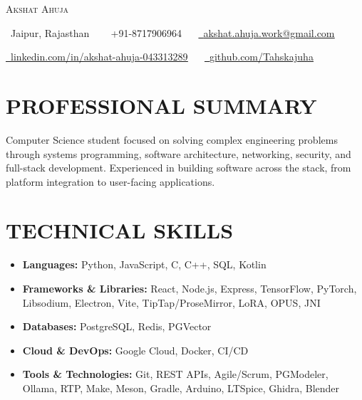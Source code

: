 \documentclass[letterpaper,11pt]{article}
\begin{document}
\begin{center}
    {\Huge \scshape \color{ACCENT_COLOR} Akshat Ahuja} \\ \vspace{1pt}
    
    \raisebox{-0.1\height}\faMapMarker\ Jaipur, Rajasthan
    ~~
    \small \raisebox{-0.1\height}\faPhone\ +91-8717906964 
    ~~ 
    \href{akshat.ahuja.work@gmail.com}{\raisebox{-0.1\height}\faEnvelope\  \underline{akshat.ahuja.work@gmail.com}}
    \\ \vspace{2pt} 

    \href{https://linkedin.com/in/akshat-ahuja-043313289}{\raisebox{-0.1\height}\faLinkedin\ \underline{linkedin.com/in/akshat-ahuja-043313289}}  
    ~~
    \href{https://github.com/Tahskajuha}{\raisebox{-0.1\height}\faGithub\ \underline{github.com/Tahskajuha}}
    ~~
    \vspace{-8pt}
\end{center}

\section{PROFESSIONAL SUMMARY}
Computer Science student focused on solving complex engineering problems through systems programming, software architecture, networking, security, and full-stack development. Experienced in building software across the stack, from platform integration to user-facing applications.
\vspace{-2pt}

\section{TECHNICAL SKILLS}
\begin{itemize}[noitemsep, left=0pt]
    \item \textbf{Languages:} Python, JavaScript, C, C++, SQL, Kotlin
    \item \textbf{Frameworks \& Libraries:} React, Node.js, Express, TensorFlow, PyTorch, Libsodium, Electron, Vite, TipTap/ProseMirror, LoRA, OPUS, JNI
    \item \textbf{Databases:} PostgreSQL, Redis, PGVector
    \item \textbf{Cloud \& DevOps:} Google Cloud, Docker, CI/CD
    \item \textbf{Tools \& Technologies:} Git, REST APIs, Agile/Scrum, PGModeler, Ollama, RTP, Make, Meson, Gradle, Arduino, LTSpice, Ghidra, Blender
\end{itemize}
\vspace{-13pt}
\end{document}
